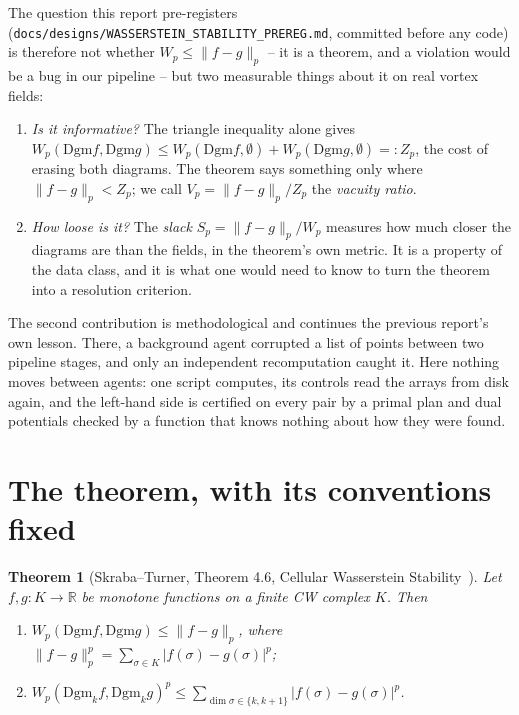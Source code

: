 \documentclass[11pt,a4paper]{article}
\newcommand{\lean}[1]{\texttt{\small #1}}
\newcommand{\Dgm}{\mathrm{Dgm}}
\newtheorem*{theorem*}{Theorem}
\begin{document}
The question this report pre-registers (\lean{docs/designs/WASSERSTEIN\_STABILITY\_PREREG.md}, committed
before any code) is therefore not whether $W_p\le\|f-g\|_p$ -- it is a theorem, and a violation would
be a bug in our pipeline -- but two measurable things about it on real vortex fields:
\begin{enumerate}[nosep]
\item \emph{Is it informative?} The triangle inequality alone gives
$W_p(\Dgm f,\Dgm g)\le W_p(\Dgm f,\emptyset)+W_p(\Dgm g,\emptyset)=:Z_p$, the cost of erasing both
diagrams. The theorem says something only where $\|f-g\|_p<Z_p$; we call $V_p=\|f-g\|_p/Z_p$ the
\emph{vacuity ratio}.
\item \emph{How loose is it?} The \emph{slack} $S_p=\|f-g\|_p/W_p$ measures how much closer the
diagrams are than the fields, in the theorem's own metric. It is a property of the data class, and
it is what one would need to know to turn the theorem into a resolution criterion.
\end{enumerate}

The second contribution is methodological and continues the previous report's own lesson. There, a
background agent corrupted a list of points between two pipeline stages, and only an independent
recomputation caught it. Here nothing moves between agents: one script computes, its controls read the
arrays from disk again, and the left-hand side is certified on every pair by a primal plan and dual
potentials checked by a function that knows nothing about how they were found.

\section{The theorem, with its conventions fixed}
\label{sec:theorem}

\begin{theorem*}[Skraba--Turner, Theorem 4.6, Cellular Wasserstein Stability~\cite{SkrabaTurner2020}]
Let $f,g:K\to\mathbb{R}$ be monotone functions on a finite CW complex $K$. Then
\begin{enumerate}[nosep,label=(\roman*)]
\item $W_p(\Dgm f,\Dgm g)\le\|f-g\|_p$, where $\|f-g\|_p^p=\sum_{\sigma\in K}|f(\sigma)-g(\sigma)|^p$;
\item $W_p(\Dgm_k f,\Dgm_k g)^p\le\sum_{\dim\sigma\in\{k,k+1\}}|f(\sigma)-g(\sigma)|^p$.
\end{enumerate}
\end{theorem*}
\end{document}
